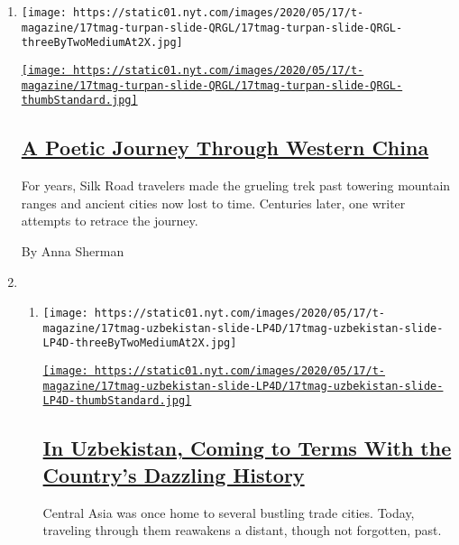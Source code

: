 \begin{enumerate}
\def\labelenumi{\arabic{enumi}.}
\item
  \texttt{[image: https://static01.nyt.com/images/2020/05/17/t-magazine/17tmag-turpan-slide-QRGL/17tmag-turpan-slide-QRGL-threeByTwoMediumAt2X.jpg]}

  \href{/2020/05/11/t-magazine/china-desert.html}{\texttt{[image: https://static01.nyt.com/images/2020/05/17/t-magazine/17tmag-turpan-slide-QRGL/17tmag-turpan-slide-QRGL-thumbStandard.jpg]}}

  \hypertarget{a-poetic-journey-through-western-china}{%
  \subsection{\texorpdfstring{\href{/2020/05/11/t-magazine/china-desert.html}{A
  Poetic Journey Through Western
  China}}{A Poetic Journey Through Western China}}\label{a-poetic-journey-through-western-china}}

  For years, Silk Road travelers made the grueling trek past towering
  mountain ranges and ancient cities now lost to time. Centuries later,
  one writer attempts to retrace the journey.

  By Anna Sherman
\item
  \begin{enumerate}
  \def\labelenumii{\arabic{enumii}.}
  \item
    \texttt{[image: https://static01.nyt.com/images/2020/05/17/t-magazine/17tmag-uzbekistan-slide-LP4D/17tmag-uzbekistan-slide-LP4D-threeByTwoMediumAt2X.jpg]}

    \href{/2020/05/11/t-magazine/uzbekistan-history-silk-road.html}{\texttt{[image: https://static01.nyt.com/images/2020/05/17/t-magazine/17tmag-uzbekistan-slide-LP4D/17tmag-uzbekistan-slide-LP4D-thumbStandard.jpg]}}

    \hypertarget{in-uzbekistan-coming-to-terms-with-the-countrys-dazzling-history}{%
    \subsection{\texorpdfstring{\href{/2020/05/11/t-magazine/uzbekistan-history-silk-road.html}{In
    Uzbekistan, Coming to Terms With the Country's Dazzling
    History}}{In Uzbekistan, Coming to Terms With the Country's Dazzling History}}\label{in-uzbekistan-coming-to-terms-with-the-countrys-dazzling-history}}

    Central Asia was once home to several bustling trade cities. Today,
    traveling through them reawakens a distant, though not forgotten,
    past.


\end{enumerate}
\end{enumerate}
